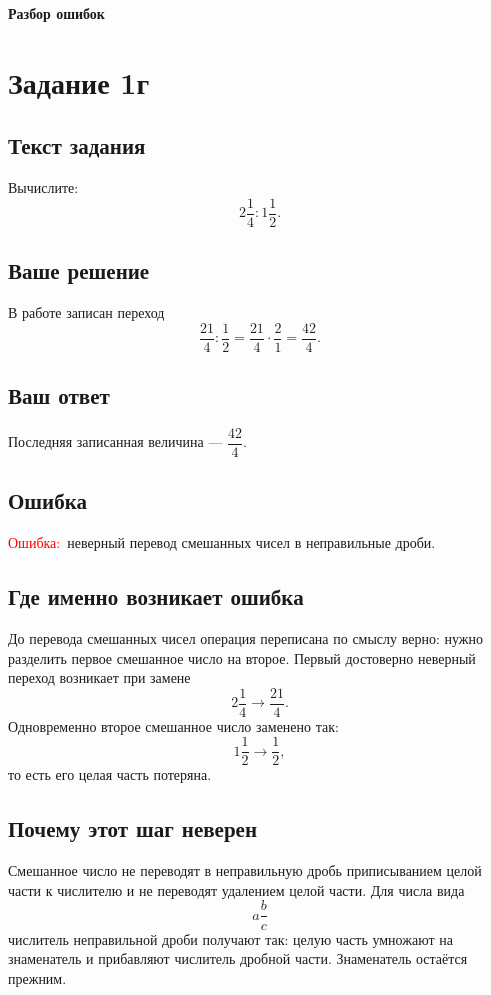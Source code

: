 \documentclass[12pt,a4paper]{article}
\newcommand{\ErrorLabel}{\textcolor{red}{Ошибка:}}
\begin{document}
\newpage
\thispagestyle{fancy}
\vspace*{\fill}
\begin{center}
{\Huge\bfseries Разбор ошибок}
\end{center}
\vspace*{\fill}

\newpage
{}\label{task:1g}
\section*{Задание 1г}

\subsection*{Текст задания}
Вычислите:
\[
2\frac{1}{4}:1\frac{1}{2}.
\]

\subsection*{Ваше решение}
В работе записан переход
\[
\frac{21}{4}:\frac{1}{2}
=\frac{21}{4}\cdot\frac{2}{1}
=\frac{42}{4}.
\]

\subsection*{Ваш ответ}
Последняя записанная величина --- $\dfrac{42}{4}$.

\subsection*{Ошибка}
\ErrorLabel\ неверный перевод смешанных чисел в неправильные дроби.

\subsection*{Где именно возникает ошибка}
До перевода смешанных чисел операция переписана по смыслу верно: нужно разделить первое смешанное число на второе. Первый достоверно неверный переход возникает при замене
\[
2\frac14\longrightarrow\frac{21}{4}.
\]
Одновременно второе смешанное число заменено так:
\[
1\frac12\longrightarrow\frac12,
\]
то есть его целая часть потеряна.

\subsection*{Почему этот шаг неверен}
Смешанное число не переводят в неправильную дробь приписыванием целой части к числителю и не переводят удалением целой части. Для числа вида
\[
a\frac{b}{c}
\]
числитель неправильной дроби получают так: целую часть умножают на знаменатель и прибавляют числитель дробной части. Знаменатель остаётся прежним.
\end{document}

